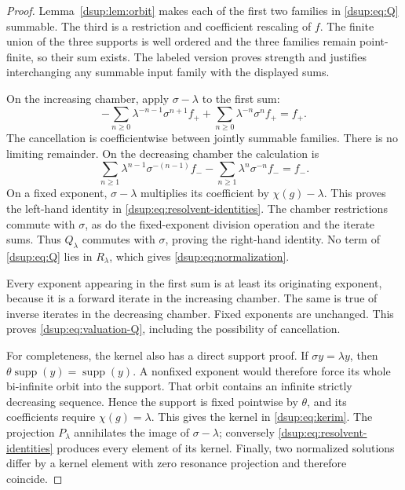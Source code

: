 \documentclass[11pt,oneside]{article}
\numberwithin{equation}{section}
\theoremstyle{definition}
\theoremstyle{remark}
\newcommand{\supp}{\operatorname{supp}}
\begin{document}
\begin{proof}
Lemma~\ref{dsup:lem:orbit} makes each of the first two families in \eqref{dsup:eq:Q}
summable. The third is a restriction and coefficient rescaling of $f$.
The finite union of the three supports is well ordered and the three
families remain point-finite, so their sum exists. The labeled version
proves strength and justifies interchanging any summable input family
with the displayed sums.

On the increasing chamber, apply $\sigma-\lambda$ to the first sum:
\[
 -\sum_{n\ge0}\lambda^{-n-1}\sigma^{n+1}f_+
 +\sum_{n\ge0}\lambda^{-n}\sigma^n f_+=f_+.
\]
The cancellation is coefficientwise between jointly summable families.
There is no limiting remainder. On the decreasing chamber the calculation is
\[
 \sum_{n\ge1}\lambda^{n-1}\sigma^{-(n-1)}f_-
 -\sum_{n\ge1}\lambda^n\sigma^{-n}f_-=f_-.
\]
On a fixed exponent, $\sigma-\lambda$ multiplies its coefficient by
$\chi(g)-\lambda$. This proves the left-hand identity in
\eqref{dsup:eq:resolvent-identities}. The chamber restrictions commute with
$\sigma$, as do the fixed-exponent division operation and the iterate
sums. Thus $Q_\lambda$ commutes with $\sigma$, proving the right-hand
identity. No term of \eqref{dsup:eq:Q} lies in $R_\lambda$, which gives
\eqref{dsup:eq:normalization}.

Every exponent appearing in the first sum is at least its originating
exponent, because it is a forward iterate in the increasing chamber.
The same is true of inverse iterates in the decreasing chamber. Fixed
exponents are unchanged. This proves \eqref{dsup:eq:valuation-Q}, including the
possibility of cancellation.

For completeness, the kernel also has a direct support proof. If
$\sigma y=\lambda y$, then $\theta\supp(y)=\supp(y)$. A nonfixed exponent
would therefore force its whole bi-infinite orbit into the support. That
orbit contains an infinite strictly decreasing sequence. Hence the support
is fixed pointwise by $\theta$, and its coefficients require
$\chi(g)=\lambda$. This gives the kernel in \eqref{dsup:eq:kerim}.
The projection $P_\lambda$ annihilates the image of $\sigma-\lambda$;
conversely \eqref{dsup:eq:resolvent-identities} produces every element of its
kernel. Finally, two normalized solutions differ by a kernel element with
zero resonance projection and therefore coincide.
\end{proof}
\end{document}
